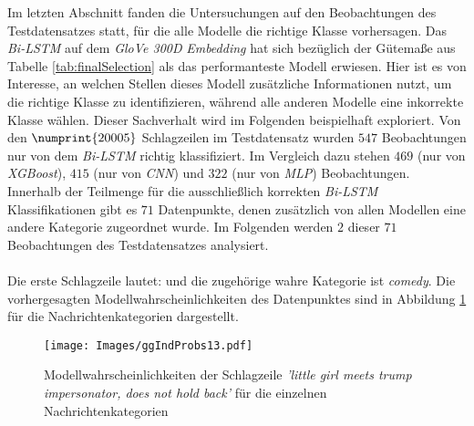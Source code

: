 \documentclass[a4paper,11pt]{article}
\begin{document}
Im letzten Abschnitt fanden die Untersuchungen auf den Beobachtungen des Testdatensatzes statt, für die alle Modelle die richtige Klasse vorhersagen. Das \textit{Bi-LSTM} auf dem \textit{GloVe 300D} \textit{Embedding} hat sich bezüglich der Gütemaße aus Tabelle \ref{tab:finalSelection} als das performanteste Modell erwiesen. Hier ist es von Interesse, an welchen Stellen dieses Modell zusätzliche Informationen nutzt, um die richtige Klasse zu identifizieren, während alle anderen Modelle eine inkorrekte Klasse wählen. Dieser Sachverhalt wird im Folgenden beispielhaft exploriert. Von den $\numprint{20005}$ Schlagzeilen im Testdatensatz wurden $547$ Beobachtungen nur von dem \textit{Bi-LSTM} richtig klassifiziert. Im Vergleich dazu stehen $469$ (nur von \textit{XGBoost}), $415$ (nur von \textit{CNN}) und $322$ (nur von \textit{MLP}) Beobachtungen. Innerhalb der Teilmenge für die ausschließlich korrekten \textit{Bi-LSTM} Klassifikationen gibt es $71$ Datenpunkte, denen zusätzlich von allen Modellen eine andere Kategorie zugeordnet wurde. Im Folgenden werden $2$ dieser $71$ Beobachtungen des Testdatensatzes analysiert. \\
\\
Die erste Schlagzeile lautet:  und die zugehörige wahre Kategorie ist \textit{comedy}. Die vorhergesagten Modellwahrscheinlichkeiten des Datenpunktes sind in Abbildung \ref{abb:IndProbs13}  für die Nachrichtenkategorien dargestellt.

\begin{figure}[H]
    \centering
\texttt{[image: Images/ggIndProbs13.pdf]} 
\caption{Modellwahrscheinlichkeiten der Schlagzeile \textit{'little girl meets trump impersonator, does not hold back'} für die einzelnen Nachrichtenkategorien}
\label{abb:IndProbs13}
\end{figure}
\end{document}
